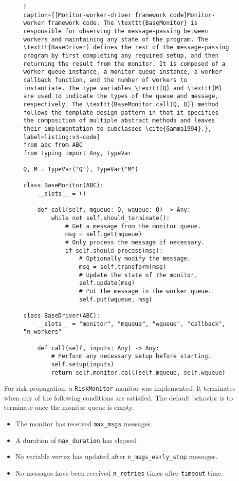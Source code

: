 \begin{figure}[htbp]
\centering
\begin{lstlisting}[
caption={[Monitor-worker-driver framework code]Monitor-worker framework code. The \texttt{BaseMonitor} is responsible for observing the message-passing between workers and maintaining any state of the program. The \texttt{BaseDriver} defines the rest of the message-passing program by first completing any required setup, and then returning the result from the monitor. It is composed of a worker queue instance, a monitor queue instance, a worker callback function, and the number of workers to instantiate. The type variables \texttt{Q} and \texttt{M} are used to indicate the types of the queue and message, respectively. The \texttt{BaseMonitor.call(Q, Q)} method follows the template design pattern in that it specifies the composition of multiple abstract methods and leaves their implementation to subclasses \cite{Gamma1994}.},
label=listing:v3-code]
from abc from ABC
from typing import Any, TypeVar

Q, M = TypeVar("Q"), TypeVar("M")

class BaseMonitor(ABC):
    __slots__ = ()

    def call(self, mqueue: Q, wqueue: Q) -> Any:
        while not self.should_terminate():
            # Get a message from the monitor queue.
            msg = self.get(mqueue)
            # Only process the message if necessary.
            if self.should_process(msg):
                # Optionally modify the message.
                msg = self.transform(msg)
                # Update the state of the monitor.
                self.update(msg)
                # Put the message in the worker queue.
                self.put(wqueue, msg)

class BaseDriver(ABC):
    __slots__ = "monitor", "mqueue", "wqueue", "callback", "n_workers"

    def call(self, inputs: Any) -> Any:
        # Perform any necessary setup before starting.
        self.setup(inputs)
        return self.monitor.call(self.mqueue, self.wqueue)
	\end{lstlisting}
\end{figure}

For risk propagation, a \texttt{RiskMonitor} monitor was implemented. It terminates when any of the following conditions are satisifed. The default behavior is to terminate once the monitor queue is empty.

\begin{itemize}
	\item The monitor has received \texttt{max\_msgs} messages.
	\item A duration of \texttt{max\_duration} has elapsed.
	\item No variable vertex has updated after \texttt{n\_msgs\_early\_stop} messages.
	\item No messages have been received \texttt{n\_retries} times after \texttt{timeout} time.
\end{itemize}

